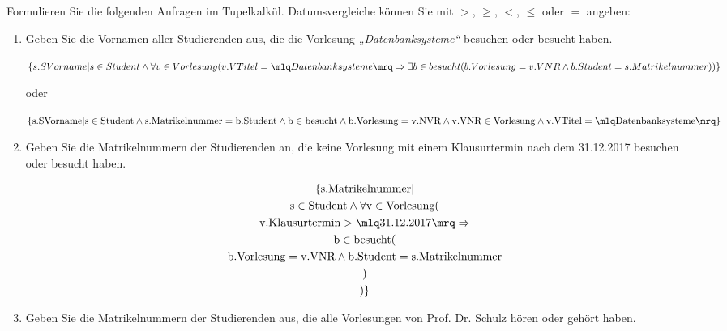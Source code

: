 \documentclass{lehramt-informatik}
\begin{document}
Formulieren Sie die folgenden Anfragen im Tupelkalkül. Datumsvergleiche
können Sie mit $>$, $\geq$, $<$, $\leq$ oder $=$ angeben:

\begin{enumerate}

\item Geben Sie die Vornamen aller Studierenden aus, die die Vorlesung
\emph{„Datenbanksysteme“} besuchen oder besucht haben.

\begin{antwort}
$\{s.SVorname |
s \in Student \land
\forall v \in
Vorlesung(
  v.VTitel = \mlq Datenbanksysteme \mrq \Rightarrow
  \exists b \in besucht(
    b.Vorlesung = v.VNR \land
    b.Student = s.Matrikelnummer
  )
)
\}$
\end{antwort}

oder

\begin{antwort}
$\{\text{s.SVorname} |
\text{s} \in \text{Student} \land
\text{s.Matrikelnummer} = \text{b.Student} \land
\text{b} \in \text{besucht} \land
\text{b.Vorlesung} = \text{v.NVR} \land
\text{v.VNR} \in \text{Vorlesung} \land
\text{v.VTitel} = \mlq \text{Datenbanksysteme} \mrq
\}$
\end{antwort}

%

\item Geben Sie die Matrikelnummern der Studierenden an, die keine
Vorlesung mit einem Klausurtermin nach dem 31.12.2017 besuchen oder
besucht haben.

\begin{antwort}
\begin{multline*}
\{\text{s.Matrikelnummer} |\\
\text{s} \in \text{Student} \land
\forall \text{v} \in
\text{Vorlesung}(\\
  \text{v.Klausurtermin} > \mlq 31.12.2017 \mrq \Rightarrow\\
  \text{b} \in \text{besucht}(\\
    \text{b.Vorlesung} = \text{v.VNR} \land
    \text{b.Student} = \text{s.Matrikelnummer}\\
  )\\
)\}
\end{multline*}
\end{antwort}

%

\item Geben Sie die Matrikelnummern der Studierenden aus, die alle
Vorlesungen von Prof. Dr. Schulz hören oder gehört haben.
\end{enumerate}
\end{document}
